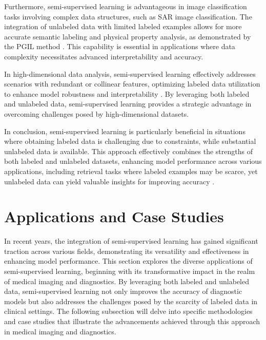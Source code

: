Furthermore, semi-supervised learning is advantageous in image classification tasks involving complex data structures, such as SAR image classification. The integration of unlabeled data with limited labeled examples allows for more accurate semantic labeling and physical property analysis, as demonstrated by the PGIL method \cite{huang2022physicallyexplainablecnnsar}. This capability is essential in applications where data complexity necessitates advanced interpretability and accuracy.

In high-dimensional data analysis, semi-supervised learning effectively addresses scenarios with redundant or collinear features, optimizing labeled data utilization to enhance model robustness and interpretability \cite{williams2018nonpenalizedvariableselectionhighdimensional}. By leveraging both labeled and unlabeled data, semi-supervised learning provides a strategic advantage in overcoming challenges posed by high-dimensional datasets.

In conclusion, semi-supervised learning is particularly beneficial in situations where obtaining labeled data is challenging due to constraints, while substantial unlabeled data is available. This approach effectively combines the strengths of both labeled and unlabeled datasets, enhancing model performance across various applications, including retrieval tasks where labeled examples may be scarce, yet unlabeled data can yield valuable insights for improving accuracy \cite{jang2024visualdeltageneratorlarge,gao2023benefitslabeldescriptiontrainingzeroshot}.









\section{Applications and Case Studies} \label{sec:Applications and Case Studies}



In recent years, the integration of semi-supervised learning has gained significant traction across various fields, demonstrating its versatility and effectiveness in enhancing model performance. This section explores the diverse applications of semi-supervised learning, beginning with its transformative impact in the realm of medical imaging and diagnostics. By leveraging both labeled and unlabeled data, semi-supervised learning not only improves the accuracy of diagnostic models but also addresses the challenges posed by the scarcity of labeled data in clinical settings. The following subsection will delve into specific methodologies and case studies that illustrate the advancements achieved through this approach in medical imaging and diagnostics.







